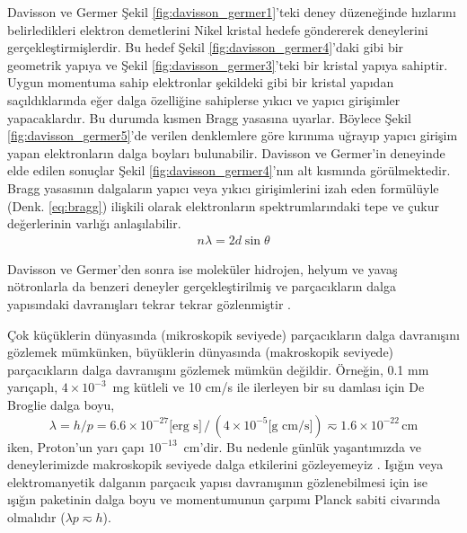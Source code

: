 \documentclass[a4paper,12pt, twoside]{article}
\begin{document}
Davisson ve Germer Şekil \ref{fig:davisson_germer1}'teki deney düzeneğinde hızlarını belirledikleri elektron demetlerini Nikel kristal hedefe göndererek deneylerini gerçekleştirmişlerdir. Bu hedef Şekil \ref{fig:davisson_germer4}'daki gibi bir geometrik yapıya ve Şekil \ref{fig:davisson_germer3}'teki bir kristal yapıya sahiptir. Uygun momentuma sahip elektronlar şekildeki gibi bir kristal yapıdan saçıldıklarında eğer dalga özelliğine sahiplerse yıkıcı ve yapıcı girişimler yapacaklardır. Bu durumda kısmen Bragg yasasına uyarlar. Böylece Şekil \ref{fig:davisson_germer5}'de verilen denklemlere göre kırınıma uğrayıp yapıcı girişim yapan elektronların dalga boyları bulunabilir. Davisson ve Germer'in deneyinde elde edilen sonuçlar Şekil \ref{fig:davisson_germer4}'nın alt kısmında görülmektedir. Bragg yasasının dalgaların yapıcı veya yıkıcı girişimlerini izah eden formülüyle (Denk. \ref{eq:bragg}) ilişkili olarak elektronların spektrumlarındaki tepe ve çukur değerlerinin varlığı anlaşılabilir.
\begin{align}
\label{eq:bragg}
n\lambda = 2 d \sin\theta
\end{align}

Davisson ve Germer'den sonra ise moleküler hidrojen, helyum ve yavaş nötronlarla da benzeri deneyler gerçekleştirilmiş ve parçacıkların dalga yapısındaki davranışları tekrar tekrar gözlenmiştir \cite{book:Gasiorowicz}.

Çok küçüklerin dünyasında (mikroskopik seviyede) parçacıkların dalga davranışını gözlemek mümkünken, büyüklerin dünyasında (makroskopik seviyede) parçacıkların dalga davranışını gözlemek mümkün değildir. Örneğin, 0.1 mm yarıçaplı, $4\times 10^{-3}$~mg kütleli ve 10 cm/s ile ilerleyen bir su damlası için De Broglie dalga boyu,
\begin{equation*}
\lambda = h/p = 6.6\times 10^{-27} \text{[erg s]}\,/\,(4\times 10^{-5} \text{[g cm/s]}) \eqsim 1.6\times 10^{-22}\,\text{cm}
\end{equation*}
iken, Proton'un yarı çapı $10^{-13}$~cm'dir. Bu nedenle günlük yaşantımızda ve deneylerimizde makroskopik seviyede dalga etkilerini gözleyemeyiz \cite{book:Gasiorowicz}. Işığın veya elektromanyetik dalganın parçacık yapısı davranışının gözlenebilmesi için ise ışığın paketinin dalga boyu ve momentumunun çarpımı Planck sabiti civarında olmalıdır ($\lambda p \eqsim h$).
\end{document}
